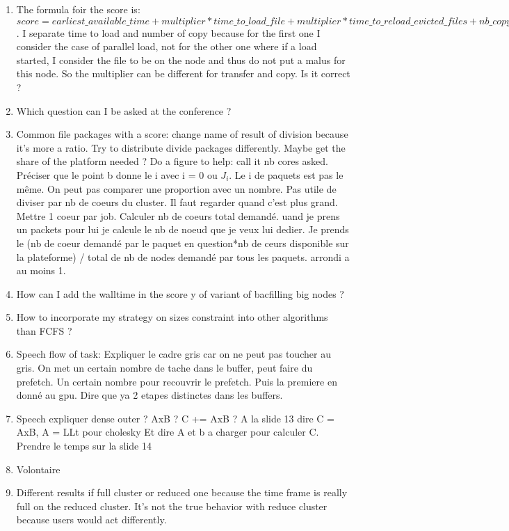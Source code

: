 \documentclass[a4paper]{article}
\begin{document}
	\begin{enumerate}
		\item The formula foir the score is: $score = earliest\_available\_time + multiplier*time\_to\_load\_file + multiplier*time\_to\_reload\_evicted\_files + nb\_copy\_file\_to\_load*time\_to\_load\_file*multiplier\_nb\_copy$. I separate time to load and number of copy because for the first one I consider the case of parallel load, not for the other one where if a load started, I consider the file to be on the node and thus do not put a malus for this node. So the multiplier can be different for transfer and copy. Is it correct ?
		\item Which question can I be asked at the conference ?
		\item Common file packages with a score: change name of result of division because it's more a ratio. Try to distribute divide packages differently. Maybe get the share of the platform needed ? Do a figure to help: call it nb cores asked. Préciser que le point b donne le i avec i = 0 ou $J_i$. Le i de paquets est pas le même. On peut pas comparer une proportion avec un nombre. Pas utile de diviser par nb de coeurs du cluster. Il faut regarder quand c'est plus grand. Mettre 1 coeur par job. Calculer nb de coeurs total demandé. uand je prens un packets pour lui je calcule le nb de noeud que je veux lui dedier. Je prends le (nb de coeur demandé par le paquet en question*nb de ceurs disponible sur la plateforme) / total de nb de nodes demandé par tous les paquets. arrondi a au moins 1.
		\item How can I add the walltime in the score y of variant of bacfilling big nodes ?
		\item How to incorporate my strategy on sizes constraint into other algorithms than FCFS ?
		\item Speech flow of task: Expliquer le cadre gris car on ne peut pas toucher au gris. On met un certain nombre de tache dans le buffer, peut faire du prefetch. Un certain nombre pour recouvrir le prefetch. Puis la premiere en donné au gpu. Dire que ya 2 etapes distinctes dans les buffers. 
		\item Speech expliquer dense outer ? AxB ? C += AxB ? A la slide 13 dire C = AxB, A = LLt pour cholesky Et dire A et b a charger pour calculer C. Prendre le temps sur la slide 14
		\item Volontaire
		\item Different results if full cluster or reduced one because the time frame is really full on the reduced cluster. It's not the true behavior with reduce cluster because users would act differently.
	\end{enumerate}
\end{document}
